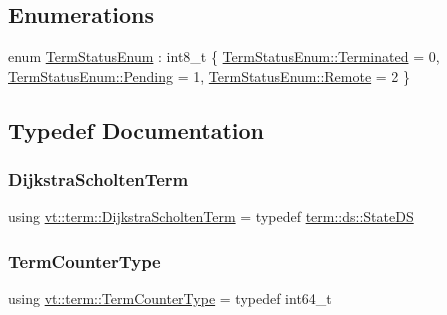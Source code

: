 \subsection*{Enumerations}
\begin{DoxyCompactItemize}
\item 
enum \hyperlink{namespacevt_1_1term_ad8ec9b371608fc88e7fdeef219785b27}{Term\+Status\+Enum} \+: int8\+\_\+t \{ \hyperlink{namespacevt_1_1term_ad8ec9b371608fc88e7fdeef219785b27afba9c4daa2dd29d1077d32d965320ac1}{Term\+Status\+Enum\+::\+Terminated} = 0, 
\hyperlink{namespacevt_1_1term_ad8ec9b371608fc88e7fdeef219785b27a2d13df6f8b5e4c5af9f87e0dc39df69d}{Term\+Status\+Enum\+::\+Pending} = 1, 
\hyperlink{namespacevt_1_1term_ad8ec9b371608fc88e7fdeef219785b27af8508f576cd3f742dfc268258dcdf0dd}{Term\+Status\+Enum\+::\+Remote} = 2
 \}
\end{DoxyCompactItemize}


\subsection{Typedef Documentation}
\mbox{\label{namespacevt_1_1term_a886197ad3670cebba77f6b87ca59b4c9}} 
\subsubsection{\texorpdfstring{Dijkstra\+Scholten\+Term}{DijkstraScholtenTerm}}
{\footnotesize\ttfamily using \hyperlink{namespacevt_1_1term_a886197ad3670cebba77f6b87ca59b4c9}{vt\+::term\+::\+Dijkstra\+Scholten\+Term} = typedef \hyperlink{structvt_1_1term_1_1ds_1_1_state_d_s}{term\+::ds\+::\+State\+DS}}

\mbox{\label{namespacevt_1_1term_a4fd378cdb0c36683afc1b3399d685f7f}} 
\subsubsection{\texorpdfstring{Term\+Counter\+Type}{TermCounterType}}
{\footnotesize\ttfamily using \hyperlink{namespacevt_1_1term_a4fd378cdb0c36683afc1b3399d685f7f}{vt\+::term\+::\+Term\+Counter\+Type} = typedef int64\+\_\+t}

